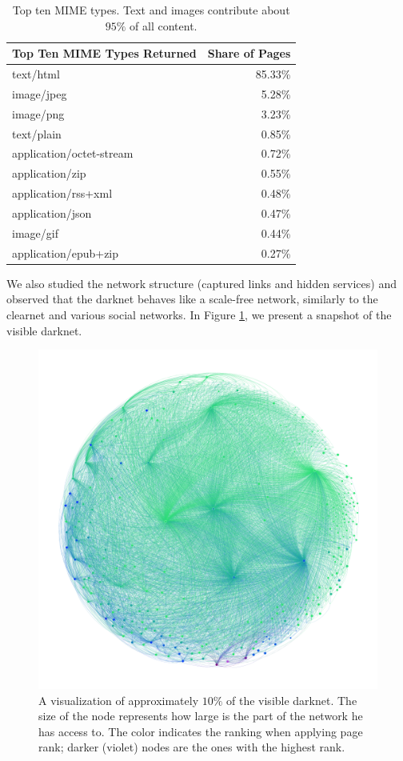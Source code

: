  \begin{table}
    \centering
    \caption{Top ten MIME types. Text and images contribute about $95\%$ of all content.}
    \label{table:mime types}
    \begin{tabular}{l|r}
         \textbf{Top Ten MIME Types Returned} & \textbf{Share of Pages} \\
         \hline
         \hline
    	text/html			&	85.33\% \\
    	\hline
    	image/jpeg			&	5.28\% \\
    	\hline
    	image/png			&	3.23\% \\
    	\hline
    	text/plain			&	0.85\% \\
    	\hline
    	application/octet-stream		&	0.72\% \\
    	\hline
    	application/zip		&	0.55\% \\
    	\hline
    	application/rss+xml	&	0.48\% \\
    	\hline
    	application/json	&	0.47\% \\
    	\hline
    	image/gif			&	0.44\% \\
    	\hline
    	application/epub+zip			&	0.27\% \\
    \end{tabular}
\end{table}
%
%
\label{sh:networkStructure}
We also studied the network structure (captured links and hidden services) and observed that the darknet behaves like a scale-free network, similarly to the clearnet and various social networks.
In Figure \ref{fig:niceGraphImage}, we present a snapshot of the visible darknet.
\begin{figure}[H]
    \centering
    \includegraphics[width=0.8\linewidth]{images/ColorPageRankSizeStronglyConnected.png}
    \caption{A visualization of approximately $10\%$ of the visible darknet. The size of the node represents how large is the part of the network he has access to. The color indicates the ranking when applying page rank; darker (violet) nodes are the ones with the highest rank.}
    \label{fig:niceGraphImage}
\end{figure}
